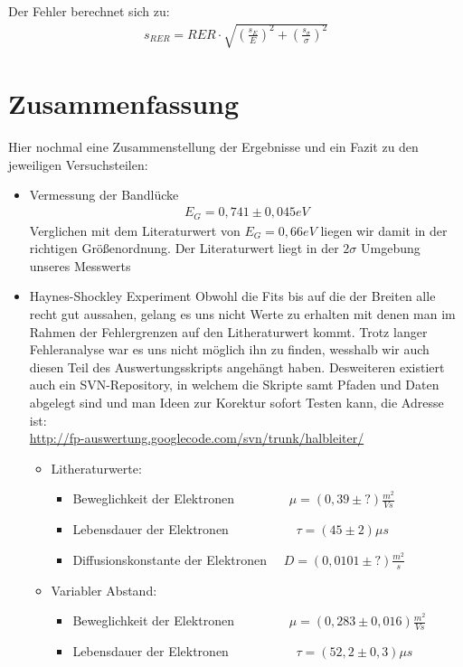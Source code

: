 \documentclass[12pt]{article}
\begin{document}
Der Fehler berechnet sich zu:
\begin{align*}
 s_{RER} = RER \cdot \sqrt{\left(\frac{s_E}{E}\right)^2 + \left(\frac{s_{\sigma}}{\sigma}\right)^2}
\end{align*}



\section{Zusammenfassung}
Hier nochmal eine Zusammenstellung der Ergebnisse und ein Fazit zu den jeweiligen Versuchsteilen:
\begin{itemize}
 \item Vermessung der Bandlücke
\begin{align*}
 E_G = 0,741 \pm 0,045 eV
\end{align*}
Verglichen mit dem Literaturwert von $E_G = 0,66 eV$ liegen wir damit in der richtigen Größenordnung. Der Literaturwert liegt in der $2\sigma$ Umgebung unseres Messwerts
\item Haynes-Shockley Experiment
Obwohl die Fits bis auf die der Breiten alle recht gut aussahen, gelang es uns nicht Werte zu erhalten mit denen man im Rahmen der Fehlergrenzen auf den Litheraturwert kommt. Trotz langer Fehleranalyse war es uns nicht möglich ihn zu finden, wesshalb wir auch diesen Teil des Auswertungsskripts angehängt haben. Desweiteren existiert auch ein SVN-Repository, in welchem die Skripte samt Pfaden und Daten abgelegt sind und man Ideen zur Korektur sofort Testen kann, die Adresse ist: \\ \url{http://fp-auswertung.googlecode.com/svn/trunk/halbleiter/}
\begin{itemize}
\item Litheraturwerte:
\begin{itemize}
 \item Beweglichkeit der Elektronen ~~~~~~~~$\mu = (0,39 \pm ?) \frac{m^2}{Vs}$ 
 \item Lebensdauer der Elektronen ~~~~~~~~~~$\tau = (45 \pm 2) \mu s $
 \item Diffusionskonstante der Elektronen ~~$D = (0,0101 \pm ?) \frac{m^2}{s}$
\end{itemize}
\item Variabler Abstand:
\begin{itemize}
 \item Beweglichkeit der Elektronen ~~~~~~~~$\mu = (0,283 \pm 0,016) \frac{m^2}{Vs}$ 
 \item Lebensdauer der Elektronen ~~~~~~~~~~$\tau = (52,2 \pm 0,3) \mu s $

\end{itemize}
\end{itemize}
\end{itemize}
\end{document}

